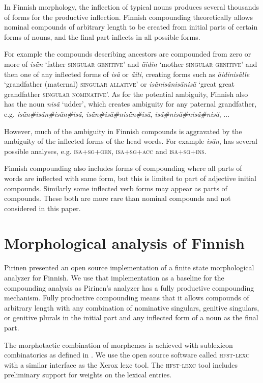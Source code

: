 \documentclass[11pt]{article}
\begin{document}
In Finnish morphology, the inflection of typical nouns produces
several thousands of forms for the productive inflection. Finnish
compounding theoretically allows nominal compounds of arbitrary length
to be created from initial parts of certain forms of nouns, and the
final part inflects in all possible forms.

For example the compounds describing ancestors are compounded from
zero or more of \emph{isän} `father \textsc{singular genitive}' and
\emph{äidin} `mother \textsc{singular genitive}' and then one of any
inflected forms of \emph{isä} or \emph{äiti}, creating forms such as
\emph{äidinisälle} `grandfather (maternal) \textsc{singular allative}'
or \emph{isänisänisänisä} `great great grandfather \textsc{singular
  nominative}'.  As for the potential ambiguity, Finnish also has the
noun \emph{nisä} `udder', which creates ambiguity for any paternal
grandfather, e.g. \emph{isän\#isän\#isän\#isä},
\emph{isän\#isä\#nisän\#isä}, \emph{isä\#nisä\#nisä\#nisä}, ...

However, much of the ambiguity in Finnish compounds is aggravated by
the ambiguity of the inflected forms of the head words. For example
\emph{isän}, has several possible analyses,
e.g. \textsc{isä+sg+gen}, \textsc{isä+sg+acc} and \textsc{isä+sg+ins}.

Finnish compounding also includes forms of compounding where all parts of
words are inflected with same form, but this is limited to part of adjective
initial compounds. Similarly some inflected verb forms may appear as parts
of compounds. These both are more rare than nominal compounds \cite{visk}
and not considered in this paper.

\section{Morphological analysis of Finnish}
\label{Sect2}

Pirinen \cite{pirinen/2008} presented an open source
implementation of a finite state morphological analyzer for Finnish.
We use that implementation as a baseline for the compounding analysis
as Pirinen's analyzer has a fully productive compounding
mechanism. Fully productive compounding means that it allows compounds
of arbitrary length with any combination of nominative singulars,
genitive singulars, or genitive plurals in the initial part and any
inflected form of a noun as the final part.

The morphotactic combination of morphemes is achieved with sublexicon
combinatorics as defined in \cite{beesley/2003}. We use the open source
software called \textsc{hfst-lexc} with a similar interface as the
Xerox lexc tool. The \textsc{hfst-lexc} tool includes preliminary
support for weights on the lexical entries.
\end{document}
